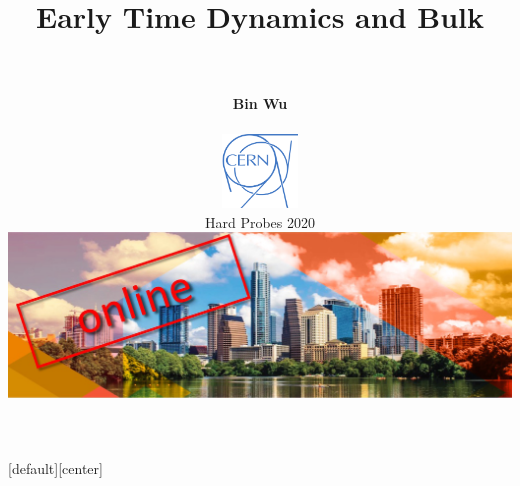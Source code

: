 \documentclass[9pt,a4paper,unknownkeysallowed,xcolor=dvipsnames,aspectratio=43]{beamer}
\begin{document}
[default][center]
\beamertemplatenavigationsymbolsempty

\author[Bin Wu]{
\\\vspace{2mm}
         {\bf\LARGE\bf\color{teablue}Bin Wu\\
           \vspace{6mm}
\begin{center}
\includegraphics[width=0.15\textwidth]{cern}
\end{center}
         }
         \vspace{4mm}
  {\large Hard Probes 2020
        \vspace{4mm}
        }
\begin{center}
\includegraphics[width=.4\textwidth]{logo}
\end{center}
}
\title[]
{
\bf %
\fontsize{14}{14} \sffamily\color{darkred} Early Time Dynamics and Bulk
}
\date[]{}
\end{document}
